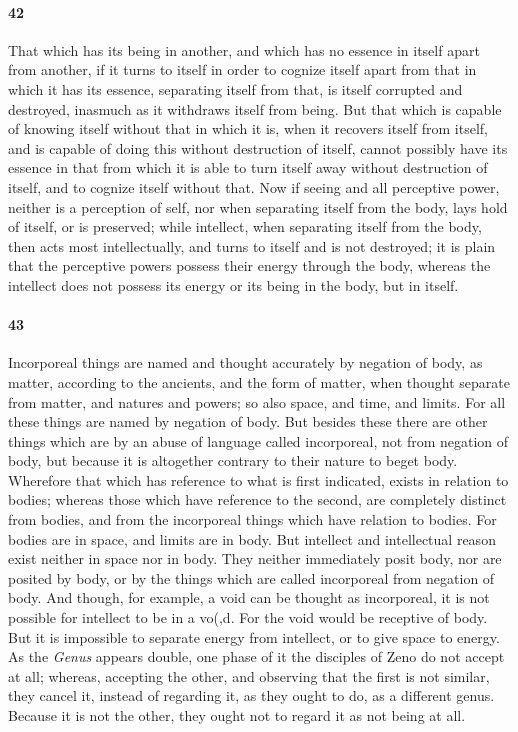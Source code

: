 \documentclass{article}
\begin{document}
\paragraph{42} That which has its being in another, and which has no essence in itself apart from another, if it turns to itself in order to cognize itself apart from that in which it has its essence, separating itself from that, is itself corrupted and destroyed, inasmuch as it withdraws itself from being. But that which is capable of knowing itself without that in which it is, when it recovers itself from itself, and is capable of doing this without destruction of itself, cannot possibly have its essence in that from which it is able to turn itself away without destruction of itself, and to cognize itself without that. Now if seeing and all perceptive power, neither is a perception of self, nor when separating itself from the body, lays hold of itself, or is preserved; while intellect, when separating itself from the body, then acts most intellectually, and turns to itself and is not destroyed; it is plain that the perceptive powers possess their energy through the body, whereas the intellect does not possess its energy or its being in the body, but in itself.

\paragraph{43} Incorporeal things are named and thought accurately by negation of body, as matter, according to the ancients, and the form of matter, when thought separate from matter, and natures and powers; so also space, and time, and limits. For all these things are named by negation of body. But besides these there are other things which are by an abuse of language called incorporeal, not from negation of body, but because it is altogether contrary to their nature to beget body. Wherefore that which has reference to what is first indicated, exists in relation to bodies; whereas those which have reference to the second, are completely distinct from bodies, and from the incorporeal things which have relation to bodies. For bodies are in space, and limits are in body. But intellect and intellectual reason exist neither in space nor in body. They neither immediately posit body, nor are posited by body, or by the things which are called incorporeal from negation of body. And though, for example, a void can be thought as incorporeal, it is not possible for intellect to be in a vo(,d. For the void would be receptive of body. But it is impossible to separate energy from intellect, or to give space to energy. As the \textit{Genus} appears double, one phase of it the disciples of Zeno do not accept at all; whereas, accepting the other, and observing that the first is not similar, they cancel it, instead of regarding it, as they ought to do, as a different genus. Because it is not the other, they ought not to regard it as not being at all.
\end{document}
